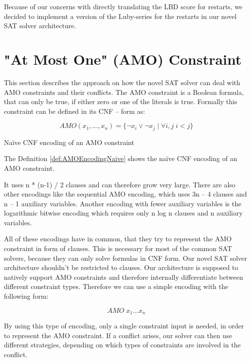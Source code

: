 Because of our concerns with directly translating the LBD score for restarts, we decided to implement a version of the Luby-series for the restarts in our novel SAT solver architecture.

\section{"At Most One" (AMO) Constraint}
\label{sec:AMOConstraint}

This section describes the approach on how the novel SAT solver can deal with AMO constraints and their conflicts. The AMO constraint is a Boolean formula, that can only be true, if either zero or one of the literals is true.  Formally this constraint can be defined in its CNF – form as:

\begin{definition}
\begin{leftbar}
\begin{displaymath}
AMO(x_1, ..., x_n)= \{\neg x_i \vee \neg x_j \; | \; \forall i, j \; i < j\}
\end{displaymath}
\end{leftbar}
\caption{Naïve CNF encoding of an AMO constraint \cite{biere2009handbook}}
\label{def:AMOEncodingNaive}
\end{definition}

The Definition \ref{def:AMOEncodingNaive} shows the naïve CNF encoding of an AMO constraint. 

It uses n * (n-1) / 2 clauses and can therefore grow very large. There are also other encodings like the sequential AMO encoding, which uses 3n – 4 clauses and n – 1 auxiliary variables. Another encoding with fewer auxiliary variables is the logarithmic bitwise encoding which requires only n log n clauses and n auxiliary variables. 
\cite{chen2010new} 

All of these encodings have in common, that they try to represent the AMO constraint in form of clauses. This is necessary for most of the common SAT solvers, because they can only solve formulas in CNF form. Our novel SAT solver architecture shouldn’t be restricted to clauses. Our architecture is supposed to natively support AMO constraints and therefore internally differentiate between different constraint types. Therefore we can use a simple encoding with the following form:

\begin{leftbar}
\begin{displaymath}
AMO \; x_1 ... x_n
\end{displaymath}
\end{leftbar}
By using this type of encoding, only a single constraint input is needed, in order to represent the AMO constraint. If a conflict arises, our solver can then use different strategies, depending on which types of constraints are involved in the conflict.

